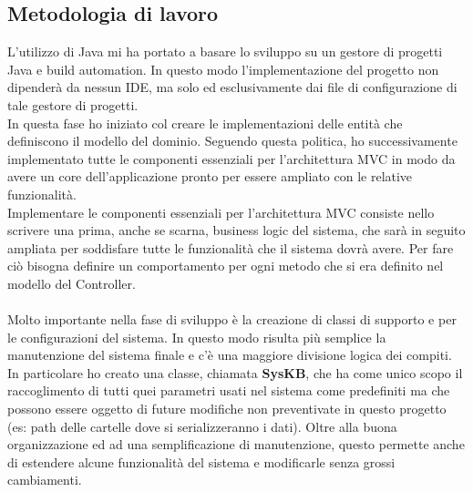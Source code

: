 \documentclass{article}
\begin{document}
  \subsection{Metodologia di lavoro}
  L'utilizzo di Java mi ha portato a basare lo sviluppo su un gestore di progetti Java e build automation. In questo modo l'implementazione del progetto non dipenderà da nessun IDE,
  ma solo ed esclusivamente dai file di configurazione di tale gestore di progetti.\\
  In questa fase ho iniziato col creare le implementazioni delle entità che definiscono il modello del dominio. Seguendo questa politica, ho successivamente
  implementato tutte le componenti essenziali per l'architettura MVC in modo da avere un core dell'applicazione pronto per essere ampliato con le relative funzionalità.\\
  Implementare le componenti essenziali per l'architettura MVC consiste nello scrivere una prima, anche se scarna, business logic del sistema, che sarà in seguito ampliata per soddisfare tutte le funzionalità
  che il sistema dovrà avere. Per fare ciò bisogna definire un comportamento per ogni metodo che si era definito nel modello del Controller.\\
  \\Molto importante nella fase di sviluppo è la creazione di classi di supporto e per le configurazioni del sistema. In questo modo risulta più semplice
  la manutenzione del sistema finale e c'è una maggiore divisione logica dei compiti. In particolare ho creato una classe, chiamata \textbf{SysKB}, che ha come unico scopo il raccoglimento
  di tutti quei parametri usati nel sistema come predefiniti ma che possono essere oggetto di future modifiche non preventivate in questo progetto (es: path
  delle cartelle dove si serializzeranno i dati). Oltre alla buona organizzazione ed ad una semplificazione di manutenzione, questo permette anche di estendere alcune funzionalità
  del sistema e modificarle senza grossi cambiamenti.
\end{document}
